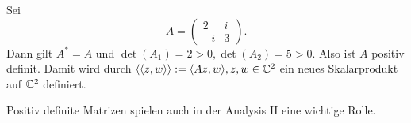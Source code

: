 \newpage
\begin{beispiel}
	\label{bsp:5.13}
	Sei
	\[
		A = \begin{pmatrix}
			2 & i \\ -i & 3
		\end{pmatrix}.
	\]
	Dann gilt $A^* = A$ und $\det(A_1) = 2 >0, \det(A_2) = 5 > 0$.
	Also ist $A$ positiv definit.
	Damit wird durch $\sk{\sk{z,w}} := \sk{Az,w}, z,w \in \CC^2$ ein neues Skalarprodukt auf $\mathbb{C}^2$ definiert.
\end{beispiel}

\begin{bemerkung}
	\label{bem:5.14}
	Positiv definite Matrizen spielen auch in der Analysis II eine wichtige Rolle.
\end{bemerkung}
\newpage